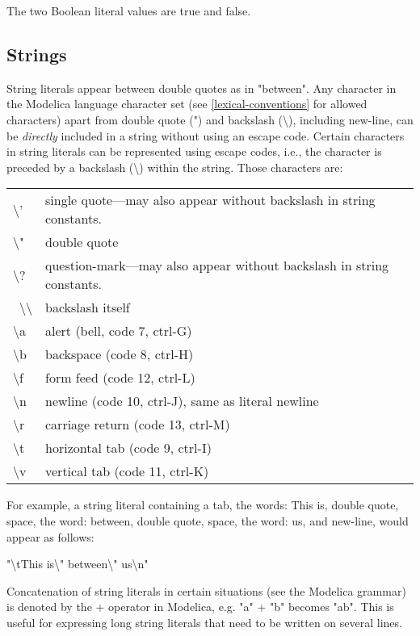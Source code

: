 The two Boolean literal values are true and false.

\subsection{Strings}

String literals appear between double quotes as in "between". Any
character in the Modelica language character set (see \ref{lexical-conventions} for
allowed characters) apart from double quote (") and backslash
(\textbackslash{}), including new-line, can be \emph{directly} included
in a string without using an escape code. Certain characters in string
literals can be represented using escape codes, i.e., the character is
preceded by a backslash (\textbackslash{}) within the string. Those
characters are:

\begin{longtable}[c]{@{}ll@{}}
\textbackslash{}' & single quote---may also appear without backslash in
string constants.\\ 
\textbackslash{}" & double quote\\ 
\textbackslash{}? & question-mark---may also appear without backslash in
string constants.\\ \
\textbackslash{}\textbackslash{} & backslash itself\\ 
\textbackslash{}a & alert (bell, code 7, ctrl-G)\\ 
\textbackslash{}b & backspace (code 8, ctrl-H)\\ 
\textbackslash{}f & form feed (code 12, ctrl-L)\\ 
\textbackslash{}n & newline (code 10, ctrl-J), same as literal
newline\\ 
\textbackslash{}r & carriage return (code 13, ctrl-M)\\ 
\textbackslash{}t & horizontal tab (code 9, ctrl-I)\\ 
\textbackslash{}v & vertical tab (code 11, ctrl-K)\\ 
\end{longtable}

For example, a string literal containing a tab, the words: This is,
double quote, space, the word: between, double quote, space, the word:
us, and new-line, would appear as follows:

"\textbackslash{}tThis is\textbackslash{}" between\textbackslash{}"
us\textbackslash{}n"

Concatenation of string literals in certain situations (see the Modelica
grammar) is denoted by the + operator in Modelica, e.g. "a" + "b"
becomes "ab". This is useful for expressing long string literals that
need to be written on several lines.


